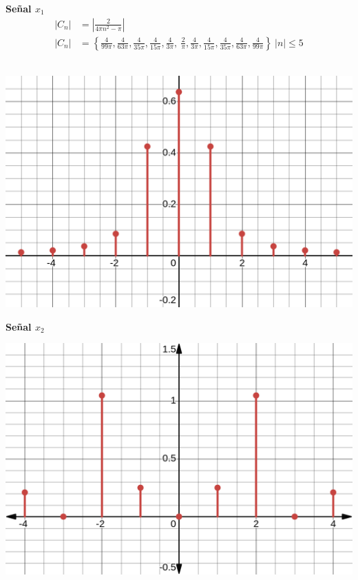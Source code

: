 \documentclass[12pt,a4paper]{report}
\begin{document}
\begin{enumerate}[label=\alph*),left=0pt]
\begin{itemize}[left=0pt]

  \textbf{Señal $x_1$}\\
      $$
      \begin{aligned}
        |C_{n} |&=|\frac{2}{4\pi n^{2} -\pi } | \\
        |C_{n} |&=\left\{\frac{4}{99\pi } ,\frac{4}{63\pi } ,\frac{4}{35\pi } ,\frac{4}{15\pi } ,\frac{4}{3\pi } ,\ \frac{2}{\pi } ,\frac{4}{3\pi } ,\frac{4}{15\pi } ,\frac{4}{35\pi } ,\frac{4}{63\pi } ,\frac{4}{99\pi }\right\} \ |n|\leq 5
        \end{aligned}
        $$
\\

 \centering
  \begin{minipage}[h]{0.6\textwidth}
      \includegraphics[width=1\textwidth]{images/ej.2.3.png}
  \end{minipage}
\newpage

     \textbf{Señal $x_2$}\\
  \begin{minipage}[h]{0.6\textwidth}
      \includegraphics[width=1\textwidth]{images/ej2.6.png}
  \end{minipage}




\end{itemize}
\end{enumerate}
\end{document}
